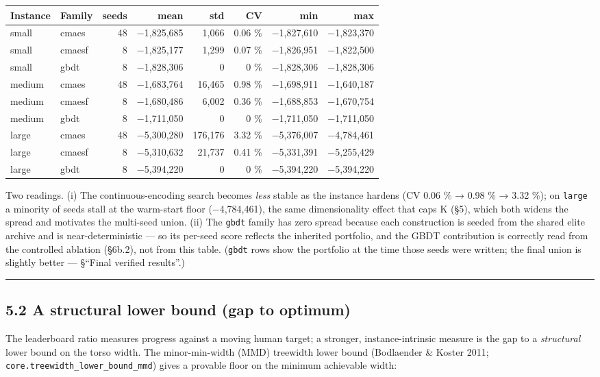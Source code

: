 \documentclass[
  11pt,
]{article}
\begin{document}
\begin{longtable}[]{@{}llrrrrrr@{}}
\toprule
Instance & Family & seeds & mean & std & CV & min & max\tabularnewline
\midrule
\endhead
small & cmaes & 48 & −1,825,685 & 1,066 & 0.06 \% & −1,827,610 &
−1,823,370\tabularnewline
small & cmaesf & 8 & −1,825,177 & 1,299 & 0.07 \% & −1,826,951 &
−1,822,500\tabularnewline
small & gbdt & 8 & −1,828,306 & 0 & 0 \% & −1,828,306 &
−1,828,306\tabularnewline
medium & cmaes & 48 & −1,683,764 & 16,465 & 0.98 \% & −1,698,911 &
−1,640,187\tabularnewline
medium & cmaesf & 8 & −1,680,486 & 6,002 & 0.36 \% & −1,688,853 &
−1,670,754\tabularnewline
medium & gbdt & 8 & −1,711,050 & 0 & 0 \% & −1,711,050 &
−1,711,050\tabularnewline
large & cmaes & 48 & −5,300,280 & 176,176 & 3.32 \% & −5,376,007 &
−4,784,461\tabularnewline
large & cmaesf & 8 & −5,310,632 & 21,737 & 0.41 \% & −5,331,391 &
−5,255,429\tabularnewline
large & gbdt & 8 & −5,394,220 & 0 & 0 \% & −5,394,220 &
−5,394,220\tabularnewline
\bottomrule
\end{longtable}

Two readings. (i) The continuous-encoding search becomes \emph{less}
stable as the instance hardens (CV 0.06 \% → 0.98 \% → 3.32 \%); on
\texttt{large} a minority of seeds stall at the warm-start floor
(−4,784,461), the same dimensionality effect that caps K (§5), which
both widens the spread and motivates the multi-seed union. (ii) The
\texttt{gbdt} family has zero spread because each construction is seeded
from the shared elite archive and is near-deterministic --- so its
per-seed score reflects the inherited portfolio, and the GBDT
contribution is correctly read from the controlled ablation (§6b.2), not
from this table. (\texttt{gbdt} rows show the portfolio at the time
those seeds were written; the final union is slightly better ---
§``Final verified results''.)

\begin{center}\rule{0.5\linewidth}{0.5pt}\end{center}

\hypertarget{a-structural-lower-bound-gap-to-optimum}{%
\subsection{5.2 A structural lower bound (gap to
optimum)}\label{a-structural-lower-bound-gap-to-optimum}}

The leaderboard ratio measures progress against a moving human target; a
stronger, instance-intrinsic measure is the gap to a \emph{structural}
lower bound on the torso width. The minor-min-width (MMD) treewidth
lower bound (Bodlaender \& Koster 2011;
\texttt{core.treewidth\_lower\_bound\_mmd}) gives a provable floor on
the minimum achievable width:
\end{document}
